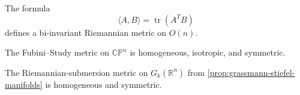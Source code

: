 \begin{proposition}
\label{prop:orthogonal-group-bi-invariant-metric}
The formula
\[
\langle A,B\rangle=\operatorname{tr}(A^TB)
\]
defines a bi-invariant Riemannian metric on $O(n)$.
\end{proposition}

\begin{proposition}
\label{prop:fubini-study-metric-homogeneous}
The Fubini--Study metric on $\mathbb{CP}^n$ is homogeneous, isotropic, and
symmetric.
\end{proposition}

\begin{proposition}
\label{prop:grassmannian-metric-homogeneous}
The Riemannian-submersion metric on $G_k(\mathbb R^n)$ from
\cref{prop:grassmann-stiefel-manifolds} is homogeneous and symmetric.
\end{proposition}
